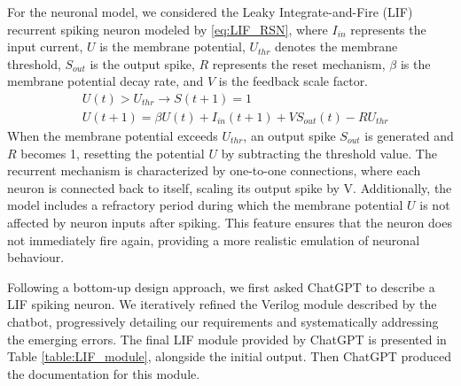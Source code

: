 For the neuronal model, we considered the Leaky Integrate-and-Fire (LIF) recurrent spiking neuron modeled by \ref{eq:LIF_RSN}, where $I_{in}$ represents the input current, $U$ is the membrane potential, $U_{thr}$ denotes the membrane threshold, $S_{out}$ is the output spike, $R$ represents the reset mechanism, $\beta$ is the membrane potential decay rate, and $V$ is the feedback scale factor.
\begin{equation}
\label{eq:LIF_RSN}
\begin{aligned}
& U(t) > U_{thr}  \rightarrow S(t+1)=1\\
& U(t+1)=\beta U(t)+I_{in}(t+1)+VS_{out}(t)-RU_{thr}
\end{aligned}
\end{equation}
When the membrane potential exceeds $U_{thr}$, an output spike $S_{out}$ is generated and $R$ becomes 1, resetting the potential $U$ by subtracting the threshold value.
The recurrent mechanism is characterized by one-to-one connections, where each neuron is connected back to itself, scaling its output spike by V.
Additionally, the model includes a refractory period during which the membrane potential $U$ is not affected by neuron inputs after spiking. This feature ensures that the neuron does not immediately fire again, providing a more realistic emulation of neuronal behaviour.


Following a bottom-up design approach, we first asked ChatGPT to describe a LIF spiking neuron.
We iteratively refined the Verilog module described by the chatbot, progressively detailing our requirements and systematically addressing the emerging errors.
The final LIF module provided by ChatGPT is presented in Table \ref{table:LIF_module}, alongside the initial output.
Then ChatGPT produced the documentation for this module.





